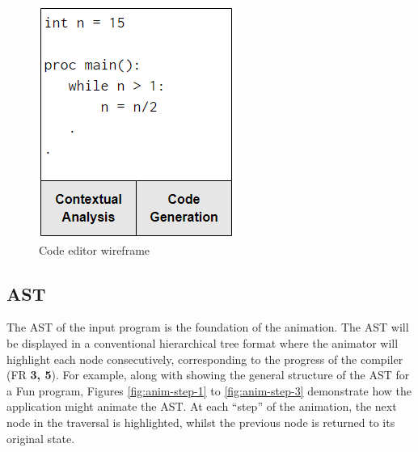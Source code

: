 \documentclass{l4proj}
\begin{document}
\begin{figure}[h]
\centering
\includegraphics[scale=0.6]{images/code-editor-wireframe.png}
\caption{Code editor wireframe}
\label{fig:code-editor-wireframe}	
\end{figure}

\subsection{AST}
The AST of the input program is the foundation of the animation. The AST will be displayed in a conventional hierarchical tree format where the animator will highlight each node consecutively, corresponding to the progress of the compiler (FR \textbf{3, 5}). For example, along with showing the general structure of the AST for a Fun program, Figures \ref{fig:anim-step-1} to \ref{fig:anim-step-3} demonstrate how the application might animate the AST. At each ``step'' of the animation, the next node in the traversal is highlighted, whilst the previous node is returned to its original state.
\end{document}
